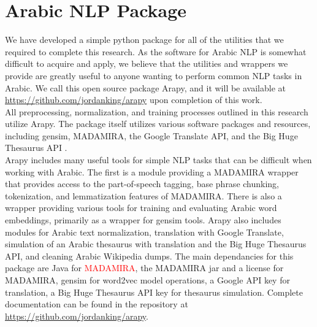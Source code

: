\section{Arabic NLP Package}
\label{sec:arapy}

We have developed a simple python package for all of the utilities that we required to complete this research. As the software for Arabic NLP is somewhat difficult to acquire and apply, we believe that the utilities and wrappers we provide are greatly useful to anyone wanting to perform common NLP tasks in Arabic. We call this open source package Arapy, and it will be available at \url{https://github.com/jordanking/arapy} upon completion of this work. 
\\
All preprocessing, normalization, and training processes outlined in this research utilize Arapy. The package itself utilizes various software packages and resources, including gensim, MADAMIRA, the Google Translate API, and the Big Huge Thesaurus API \cite{rehurek_lrec,pasha:2014,google:online,bhl:online}.
\\
Arapy includes many useful tools for simple NLP tasks that can be difficult when working with Arabic. The first is a module providing a MADAMIRA wrapper that provides access to the part-of-speech tagging, base phrase chunking, tokenization, and lemmatization features of MADAMIRA. There is also a wrapper providing various tools for training and evaluating Arabic word embeddings, primarily as a wrapper for gensim tools. Arapy also includes modules for Arabic text normalization, translation with Google Translate, simulation of an Arabic thesaurus with translation and the Big Huge Thesaurus API, and cleaning Arabic Wikipedia dumps. The main dependancies for this package are Java for \textcolor{red}{MADAMIRA}, the MADAMIRA jar and a license for MADAMIRA, gensim for word2vec model operations, a Google API key for translation, a Big Huge Thesaurus API key for thesaurus simulation. Complete documentation can be found in the repository at \url{https://github.com/jordanking/arapy}.

